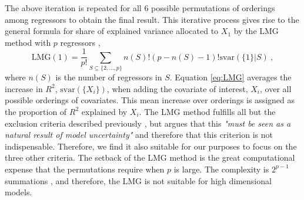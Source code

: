 The above iteration is repeated for all 6 possible permutations of orderings among regressors to obtain the final result.
This iterative process gives rise to the general formula for share of explained variance allocated to $X_1$ by the LMG method with $p$ regressors \citep{gromping_relaimpo},
\begin{equation}
    \label{eq:LMG}
    \text{LMG}(1) = \frac{1}{p!} \sum_{S \subseteq \{2, ..., p\}} n(S)! (p - n(S)-1)! \text{svar}(\{1\} \lvert S) \ ,
\end{equation} 
where $n(S)$ is the number of regressors in $S$.
Equation \eqref{eq:LMG} averages the increase in $R^2$, $\text{svar}(\{X_i\})$, when adding the covariate of interest, $X_i$, over all possible orderings of covariates. 
This mean increase over orderings is assigned as the proportion of $R^2$ explained by $X_i$.
The LMG method fulfills all but the exclusion criteria described previously \citep{gromping_relaimpo}, but \citet{gromping_relaimpo} argues that this \textit{"must be seen as a natural result of model uncertainty"} and therefore that this criterion is not indispensable.
Therefore, we find it also suitable for our purposes to focus on the three other criteria.
The setback of the LMG method is the great computational expense that the permutations require when $p$ is large. The complexity is $2^{p-1}$ summations \citep{gromping_relaimpo}, and therefore, the LMG is not suitable for high dimensional models. 



